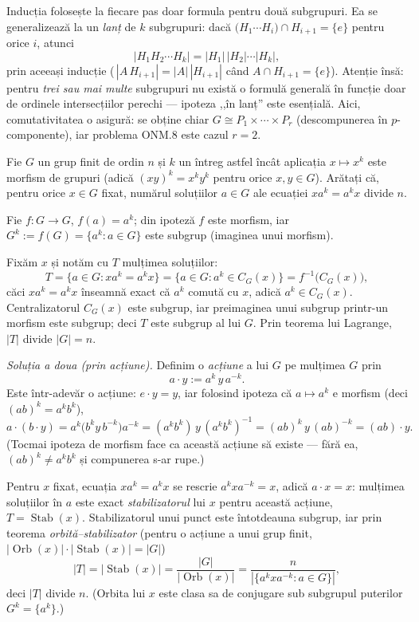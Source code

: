 \begin{obs}
Inducția folosește la fiecare pas doar formula pentru două
subgrupuri. Ea se generalizează la un \emph{lanț} de $k$ subgrupuri:
dacă $\bigl(H_{1}\cdots H_{i}\bigr)\cap H_{i+1}=\{e\}$ pentru orice $i$,
atunci
\[
  |H_{1}H_{2}\cdots H_{k}|=|H_{1}|\,|H_{2}|\cdots|H_{k}| ,
\]
prin aceeași inducție ($\,|A\,H_{i+1}|=|A|\,|H_{i+1}|$ când
$A\cap H_{i+1}=\{e\}$). Atenție însă: pentru \emph{trei sau mai
multe} subgrupuri nu există o formulă generală în funcție
doar de ordinele intersecțiilor perechi --- ipoteza ,,în lanț''
este esențială. Aici, comutativitatea o asigură: se obține
chiar $G\cong P_{1}\times\cdots\times P_{r}$ (descompunerea în
$p$-componente), iar problema ONM.8 este cazul $r=2$.
\end{obs}

\begin{problema}
Fie $G$ un grup finit de ordin $n$ și $k$ un întreg astfel încât
aplicația $x\mapsto x^{k}$ este morfism de grupuri (adică
$(xy)^{k}=x^{k}y^{k}$ pentru orice $x,y\in G$). Arătați că, pentru
orice $x\in G$ fixat, numărul soluțiilor $a\in G$ ale ecuației
$xa^{k}=a^{k}x$ divide $n$.
\end{problema}

\begin{solutie}
Fie $f:G\to G$, $f(a)=a^{k}$; din ipoteză $f$ este morfism, iar
$G^{k}:=f(G)=\{a^{k}:a\in G\}$ este subgrup (imaginea unui morfism).

Fixăm $x$ și notăm cu $T$ mulțimea soluțiilor:
\[
  T=\{a\in G : x a^{k}=a^{k}x\}=\{a\in G : a^{k}\in C_{G}(x)\}=f^{-1}\bigl(C_{G}(x)\bigr),
\]
căci $xa^{k}=a^{k}x$ înseamnă exact că $a^{k}$ comută cu
$x$, adică $a^{k}\in C_{G}(x)$. Centralizatorul $C_{G}(x)$ este subgrup,
iar preimaginea unui subgrup printr-un morfism este subgrup; deci $T$ este
subgrup al lui $G$. Prin teorema lui Lagrange, $|T|$ divide $|G|=n$.

\smallskip
\textit{Soluția a doua (prin acțiune).} Definim o \emph{acțiune}
a lui $G$ pe mulțimea $G$ prin
\[
  a\cdot y:=a^{k}\,y\,a^{-k}.
\]
Este într-adevăr o acțiune: $e\cdot y=y$, iar folosind ipoteza
că $a\mapsto a^{k}$ e morfism (deci $(ab)^{k}=a^{k}b^{k}$),
\[
  a\cdot(b\cdot y)=a^{k}\bigl(b^{k}y\,b^{-k}\bigr)a^{-k}
  =(a^{k}b^{k})\,y\,(a^{k}b^{k})^{-1}=(ab)^{k}\,y\,(ab)^{-k}=(ab)\cdot y .
\]
(Tocmai ipoteza de morfism face ca această acțiune să existe ---
fără ea, $(ab)^{k}\neq a^{k}b^{k}$ și compunerea s-ar rupe.)

Pentru $x$ fixat, ecuația $xa^{k}=a^{k}x$ se rescrie
$a^{k}xa^{-k}=x$, adică $a\cdot x=x$: mulțimea soluțiilor în
$a$ este exact \emph{stabilizatorul} lui $x$ pentru această acțiune,
$T=\operatorname{Stab}(x)$. Stabilizatorul unui punct este întotdeauna
subgrup, iar prin teorema \emph{orbită--stabilizator} (pentru o
acțiune a unui grup finit, $|\!\operatorname{Orb}(x)|\cdot
|\!\operatorname{Stab}(x)|=|G|$)
\[
  |T|=|\!\operatorname{Stab}(x)|=\frac{|G|}{|\!\operatorname{Orb}(x)|}
     =\frac{n}{|\{a^{k}xa^{-k}:a\in G\}|},
\]
deci $|T|$ divide $n$. (Orbita lui $x$ este clasa sa de conjugare sub
subgrupul puterilor $G^{k}=\{a^{k}\}$.)
\end{solutie}

